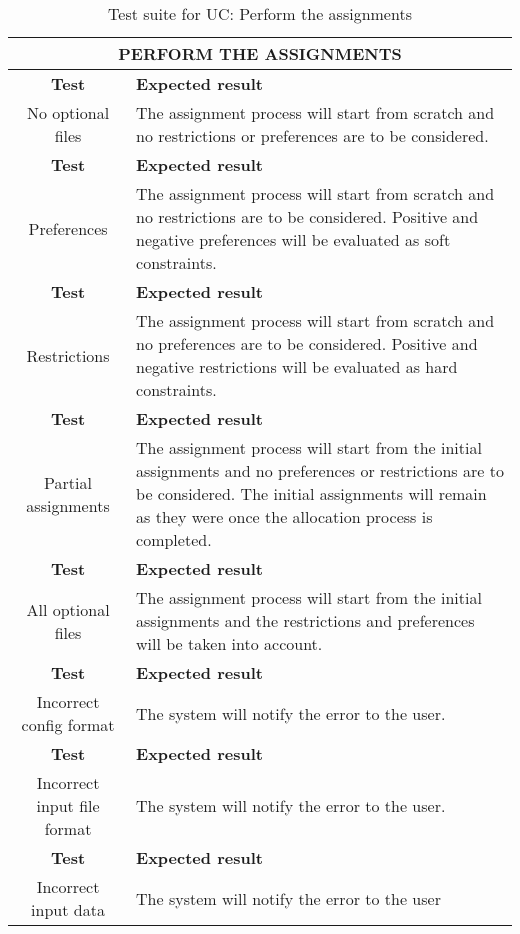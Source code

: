 \begin{table}[H]
    \centering
    \caption{Test suite for UC: Perform the assignments}
    \label{uc-table-assignments}
    \begin{tabular}{|c|p{8cm}|}
        \hline
        \multicolumn{2}{|c|}{\textbf{PERFORM THE ASSIGNMENTS}} \\
        \hline
        \rowcolor{blue!10}
        \textbf{Test} & \textbf{Expected result} \\
        \rowcolor{blue!30}
        No optional files & The assignment process will start from scratch and no restrictions or preferences are to be considered. \\
        \rowcolor{blue!10}
        \textbf{Test} & \textbf{Expected result} \\
        \rowcolor{blue!30}
        Preferences & The assignment process will start from scratch and no restrictions are to be considered. Positive and negative preferences will be evaluated as soft constraints. \\
        \rowcolor{blue!10}
        \textbf{Test} & \textbf{Expected result} \\
        \rowcolor{blue!30}
        Restrictions & The assignment process will start from scratch and no preferences are to be considered. Positive and negative restrictions will be evaluated as hard constraints. \\
        \rowcolor{blue!10}
        \textbf{Test} & \textbf{Expected result} \\
        \rowcolor{blue!30}
        Partial assignments & The assignment process will start from the initial assignments and no preferences or restrictions are to be considered. The initial assignments will remain as they were once the allocation process is completed. \\
        \rowcolor{blue!10}
        \textbf{Test} & \textbf{Expected result} \\
        \rowcolor{blue!30}
        All optional files & The assignment process will start from the initial assignments and the restrictions and preferences will be taken into account. \\
        \rowcolor{blue!10}
        \textbf{Test} & \textbf{Expected result} \\
        \rowcolor{blue!30}
        Incorrect config format & The system will notify the error to the user. \\
        \rowcolor{blue!10}
        \textbf{Test} & \textbf{Expected result} \\
        \rowcolor{blue!30}
        Incorrect input file format & The system will notify the error to the user. \\
        \rowcolor{blue!10}
        \textbf{Test} & \textbf{Expected result} \\
        \rowcolor{blue!30}
        Incorrect input data & The system will notify the error to the user \\
        \hline
    \end{tabular}
\end{table}


